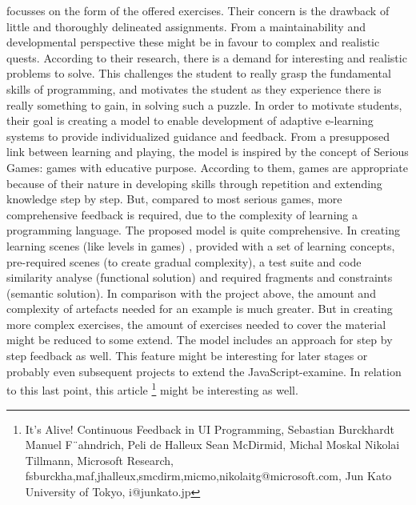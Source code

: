 \documentclass{article}
\begin{document}
focusses on the form of the offered exercises. Their concern is the 
drawback of little and  thoroughly delineated assignments. From a
maintainability and developmental perspective these might be in favour 
to complex and realistic quests. According to their research, there is a demand
for interesting and realistic problems to solve. This challenges the student to
really grasp the fundamental skills of programming, and motivates the student as
they experience there is really something to gain, in solving such a puzzle.
In order to motivate students, their goal is creating a model to enable 
development of adaptive e-learning systems to provide individualized guidance 
and feedback. From a presupposed link between learning and playing, the model
is inspired by the concept of Serious Games: games with educative purpose. 
According to them, games are appropriate because of their nature in developing
skills through repetition and extending knowledge step by step. But, 
compared to most serious games, more comprehensive feedback is 
required, due to the complexity of learning a programming language. The proposed
model is quite comprehensive. In creating learning scenes (like levels in games)
, provided with a set of learning concepts, pre-required scenes (to create 
gradual complexity), a test suite and code similarity analyse (functional 
solution) and
required fragments and constraints (semantic solution). In comparison with the 
project above, the amount and complexity of artefacts needed for an example is
much greater. But in creating more complex exercises, the amount of exercises 
needed to cover the material might be reduced to some extend. The model includes 
an approach for step by step feedback as well. This feature might be interesting 
for later stages or probably even subsequent projects to extend the 
JavaScript-examine. In relation to this last point, this article
\footnote{It’s Alive! 
Continuous Feedback in UI Programming,
Sebastian Burckhardt Manuel F¨ahndrich,
Peli de Halleux Sean McDirmid,
Michal Moskal Nikolai Tillmann,
Microsoft Research,
fsburckha,maf,jhalleux,smcdirm,micmo,nikolaitg@microsoft.com,
Jun Kato
University of Tokyo,
i@junkato.jp}
might be interesting as well.
\end{document}
